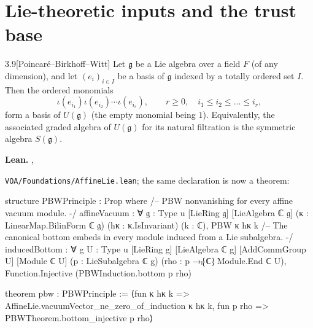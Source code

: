 \documentclass[11pt,openany]{book}
\newcommand{\lean}[1]{\texttt{\detokenize{#1}}}
\newcommand{\leanpath}[1]{\texttt{\small #1}}
\theoremstyle{definition}
\theoremstyle{plain}
\begin{document}
\chapter{Lie-theoretic inputs and the trust base}
\begingroup
\providecommand{\ltwog}{\mathfrak{g}}
\providecommand{\ltwoghat}{\widehat{\mathfrak{g}}}
\providecommand{\ltwop}{\mathfrak{p}}
\providecommand{\ltwon}{\mathfrak{n}}
\providecommand{\ltwovac}{|0\rangle}
\providecommand{\ltwoW}{\mathfrak{W}}
\providecommand{\ltwoVir}{\mathfrak{Vir}}
\providecommand{\ltwoUe}{\mathcal{U}}
\providecommand{\ltwoInd}{\operatorname{Ind}}
\providecommand{\ltwoJ}{\mathcal{J}}
\providecommand{\ltwoV}{\mathcal{V}}
\par\medskip
\begin{btheorem}{3.9}[Poincar\'e--Birkhoff--Witt]
Let $\ltwog$ be a Lie algebra over a field $F$ (of any dimension), and let $(e_i)_{i\in I}$ be a
basis of $\ltwog$ indexed by a totally ordered set $I$. Then the ordered monomials
\begin{equation*}
 \iota(e_{i_1})\iota(e_{i_2})\cdots\iota(e_{i_r}),\qquad r\ge0,\quad i_1\le i_2\le\dots\le i_r,
\end{equation*}
form a basis of $U(\ltwog)$ (the empty monomial being $1$). Equivalently, the associated graded
algebra of $U(\ltwog)$ for its natural filtration is the symmetric algebra $S(\ltwog)$.
\end{btheorem}
{\raggedright\noindent\textbf{Lean.} \lean{VOA.}\allowbreak\lean{PBWPrinciple},\allowbreak\ \lean{VOA.}\allowbreak\lean{pbw}\par}
\noindent \leanpath{VOA/Foundations/AffineLie.lean}; the same declaration is now a theorem:
\begin{leancode}
structure PBWPrinciple : Prop where
  /-- PBW nonvanishing for every affine vacuum module. -/
  affineVacuum : ∀ {𝔤 : Type u} [LieRing 𝔤] [LieAlgebra ℂ 𝔤]
      (κ : LinearMap.BilinForm ℂ 𝔤) (hκ : κ.IsInvariant) (k : ℂ),
    PBW κ hκ k
  /-- The canonical bottom embeds in every module induced from a Lie subalgebra. -/
  inducedBottom : ∀ {g U : Type u} [LieRing g] [LieAlgebra ℂ g]
      [AddCommGroup U] [Module ℂ U] (p : LieSubalgebra ℂ g)
      (rho : p →ₗ⁅ℂ⁆ Module.End ℂ U),
    Function.Injective (PBWInduction.bottom p rho)

theorem pbw : PBWPrinciple :=
  ⟨fun κ hκ k => AffineLie.vacuumVector_ne_zero_of_induction κ hκ k,
    fun p rho => PBWTheorem.bottom_injective p rho⟩
\end{leancode}
\end{document}
